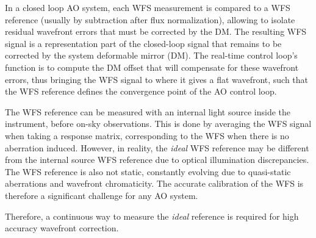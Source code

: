 \documentclass[twocolumn]{aa}
\newcommand{\og}[2]{\textcolor{orange}{\sout{#1} {#2}}}
\newcommand{\nour}[1]{\textcolor{teal}{#1}}
\begin{document}
In a closed loop AO system, each WFS measurement is compared to a WFS reference (usually by  subtraction after flux normalization), allowing to isolate residual wavefront errors that must be corrected by the DM. The resulting WFS signal is a representation
part of the closed-loop signal that remains to be corrected by the system deformable mirror (DM). The real-time control loop's function is to compute the DM offset that will compensate for these wavefront errors, thus bringing the WFS signal to where it gives a flat wavefront, such that the WFS reference defines the convergence point of the AO control loop.

 The WFS reference can be measured with an internal light source inside the instrument, before on-sky observations. This is done by averaging the WFS signal when taking a response matrix, corresponding to the WFS when there is no aberration induced. However, in reality, the \textit{ideal} WFS reference may be different from the internal source WFS reference due to optical illumination discrepancies. The WFS reference is also not static, constantly evolving due to quasi-static aberrations and wavefront chromaticity. The accurate calibration of the WFS is therefore a significant challenge for any AO system.
 

Therefore, a continuous way to measure the \textit{ideal} reference is required for high accuracy wavefront correction. 


\end{document}
